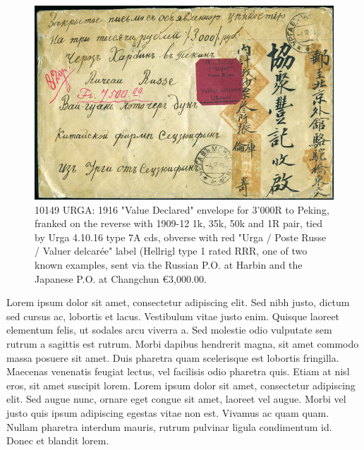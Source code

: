 \begin{figure}[htbp]
\centering
\includegraphics[width=.95\textwidth]{../russian-post-in-mongolia/10149.jpg}
\caption{ 
10149	URGA: 1916 "Value Declared" envelope for 3'000R to Peking,
franked on the reverse with 1909-12 1k, 35k, 50k and 1R pair, tied by
Urga 4.10.16 type 7A cds, obverse with red "Urga / Poste Russe / 
Valuer delcar\'ee" label (Hellrigl type 1 rated RRR, one of two known examples, 
sent via the Russian P.O. at Harbin and the Japanese P.O. at Changchun
\euro 3,000.00.
} 
\end{figure}

Lorem ipsum dolor sit amet, consectetur adipiscing elit. Sed nibh justo, dictum sed cursus ac, lobortis et lacus. Vestibulum vitae justo enim. Quisque laoreet elementum felis, ut sodales arcu viverra a. Sed molestie odio vulputate sem rutrum a sagittis est rutrum. Morbi dapibus hendrerit magna, sit amet commodo massa posuere sit amet. Duis pharetra quam scelerisque est lobortis fringilla. Maecenas venenatis feugiat lectus, vel facilisis odio pharetra quis. Etiam at nisl eros, sit amet suscipit lorem. Lorem ipsum dolor sit amet, consectetur adipiscing elit. Sed augue nunc, ornare eget congue sit amet, laoreet vel augue. Morbi vel justo quis ipsum adipiscing egestas vitae non est. Vivamus ac quam quam. Nullam pharetra
                                                    interdum mauris, rutrum pulvinar ligula condimentum id. Donec et blandit lorem. 




                        